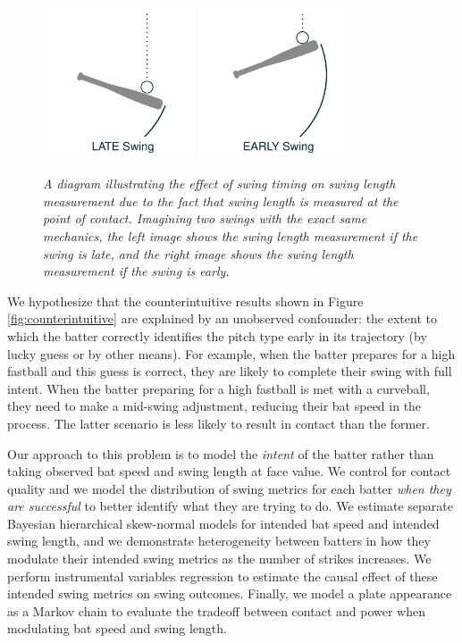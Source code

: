 \documentclass{article}
\begin{document}
    \begin{figure}[H]
      \centering
      \includegraphics[width = 0.4\textwidth]{../../figures/swing_late.pdf}
      \includegraphics[width = 0.4\textwidth]{../../figures/swing_early.pdf}
      \caption{\it A diagram illustrating the effect of swing timing on swing length measurement due to the fact that swing length is measured at the point of contact. Imagining two swings with the exact same mechanics, the left image shows the swing length measurement if the swing is late, and the right image shows the swing length measurement if the swing is early.}
      \label{fig:swing-diagram}
    \end{figure}

    We hypothesize that the counterintuitive results shown in Figure \ref{fig:counterintuitive} are explained by an unobserved confounder: the extent to which the batter correctly identifies the pitch type early in its trajectory (by lucky guess or by other means). For example, when the batter prepares for a high fastball and this guess is correct, they are likely to complete their swing with full intent. When the batter preparing for a high fastball is met with a curveball, they need to make a mid-swing adjustment, reducing their bat speed in the process. The latter scenario is less likely to result in contact than the former.

    Our approach to this problem is to model the {\it intent} of the batter rather than taking observed bat speed and swing length at face value. We control for contact quality and we model the distribution of swing metrics for each batter {\it when they are successful} to better identify what they are trying to do. We estimate separate Bayesian hierarchical skew-normal models for intended bat speed and intended swing length, and we demonstrate heterogeneity between batters in how they modulate their intended swing metrics as the number of strikes increases. We perform instrumental variables regression to estimate the causal effect of these intended swing metrics on swing outcomes. Finally, we model a plate appearance as a Markov chain to evaluate the tradeoff between contact and power when modulating bat speed and swing length.
\end{document}
